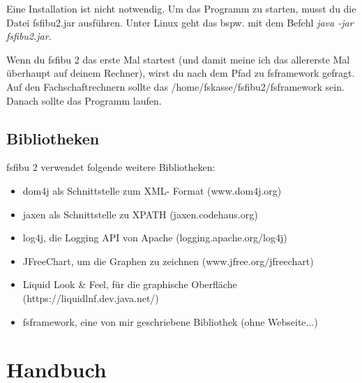 \documentclass[a4paper,10pt,halfparskip,oneside,smallheadings]{scrbook}
\begin{document}
Eine Installation ist nicht notwendig. Um das Programm zu starten, musst du die Datei fsfibu2.jar ausführen. Unter Linux geht das bspw. mit dem Befehl \textit{java -jar fsfibu2.jar}.

Wenn du fsfibu 2 das erste Mal startest (und damit meine ich das allererste Mal überhaupt auf deinem Rechner), wirst 
du nach dem Pfad zu fsframework gefragt. Auf den Fachschaftrechnern sollte das /home/fskasse/fsfibu2/fsframework sein. Danach sollte das Programm laufen.

\section{Bibliotheken}
fsfibu 2 verwendet folgende weitere Bibliotheken:
\begin{itemize}
 \item dom4j als Schnittstelle zum XML- Format (www.dom4j.org)
 \item jaxen als Schnittstelle zu XPATH (jaxen.codehaus.org)
 \item log4j, die Logging API von Apache (logging.apache.org/log4j)
 \item JFreeChart, um die Graphen zu zeichnen (www.jfree.org/jfreechart)
 \item Liquid Look \& Feel, für die graphische Oberfläche (https://liquidlnf.dev.java.net/)
 \item fsframework, eine von mir geschriebene Bibliothek (ohne Webseite...)
\end{itemize}


\chapter{Handbuch}
\end{document}
